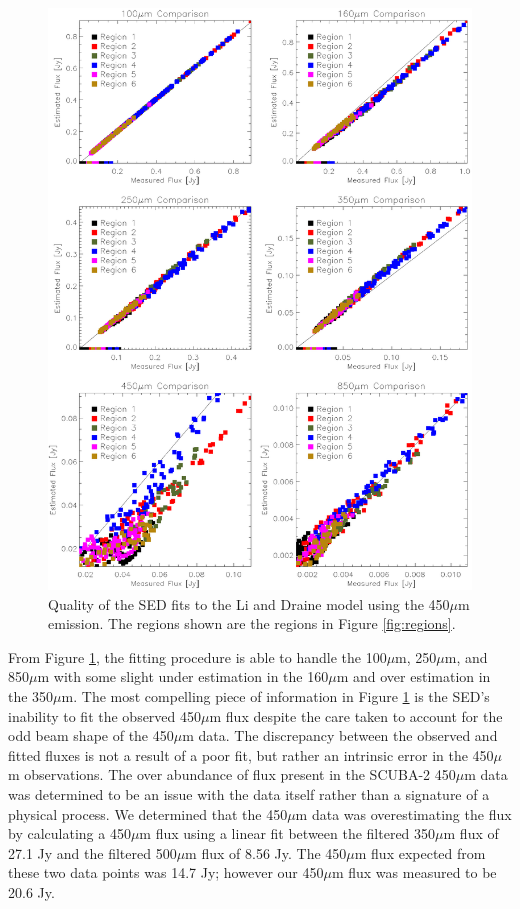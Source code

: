 \begin{figure}
  \centering
  \includegraphics[width=1.\textwidth]{sed_imgs/flux_compare_2_4.eps}
  \caption[Li and Draine Model SED Fit Quality Using 450$\mu$m Data]{Quality of the SED fits to the Li and Draine model using the 450$\mu$m emission.  The regions shown are the regions in Figure \ref{fig:regions}.}
  \label{fig:w2_4}
\end{figure}

From Figure \ref{fig:w2_4}, the fitting procedure is able to handle the 100$\mu$m, 250$\mu$m, and 850$\mu$m with some slight under estimation in the 160$\mu$m and over  estimation in the 350$\mu$m.  The most compelling piece of information in Figure \ref{fig:w2_4} is the SED's inability to fit the observed 450$\mu$m flux despite the care taken to account for the odd beam shape of the 450$\mu$m data.  The discrepancy between the observed and fitted fluxes is not a result of a poor fit, but rather an intrinsic error in the 450$\mu$m observations.  The over abundance of flux present in the SCUBA-2 450$\mu$m data was determined to be an issue with the data itself rather than a signature of a physical process.  We determined that the 450$\mu$m data was overestimating the flux by calculating a 450$\mu$m flux using a linear fit between the filtered 350$\mu$m flux of 27.1 Jy and the filtered 500$\mu$m flux of 8.56 Jy.  The 450$\mu$m flux expected from these two data points was 14.7 Jy; however our 450$\mu$m flux was measured to be 20.6 Jy.


